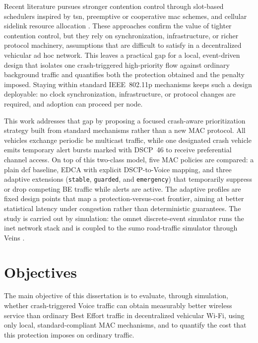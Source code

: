 Recent literature pursues stronger contention control through slot-based schedulers inspired by \gls{tsn}, preemptive or cooperative \gls{mac} schemes, and cellular sidelink resource allocation \cite{TSNCtl_Feraudo, PRP_MAC_Li, CFC_MAC_Linn, CV2X_Sidelink_Allocation}. These approaches confirm the value of tighter contention control, but they rely on synchronization, infrastructure, or richer protocol machinery, assumptions that are difficult to satisfy in a decentralized vehicular ad hoc network. This leaves a practical gap for a local, event-driven design that isolates one crash-triggered high-priority flow against ordinary background traffic and quantifies both the protection obtained and the penalty imposed. Staying within standard IEEE~802.11p mechanisms keeps such a design deployable: no clock synchronization, infrastructure, or protocol changes are required, and adoption can proceed per node.

This work addresses that gap by proposing a focused crash-aware prioritization strategy built from standard mechanisms rather than a new MAC protocol. All vehicles exchange periodic \gls{be} multicast traffic, while one designated crash vehicle emits temporary alert bursts marked with DSCP~46 to receive preferential channel access. On top of this two-class model, five MAC policies are compared: a plain \gls{dcf} baseline, EDCA with explicit DSCP-to-Voice mapping, and three adaptive extensions (\texttt{stable}, \texttt{guarded}, and \texttt{emergency}) that temporarily suppress or drop competing BE traffic while alerts are active. The adaptive profiles are fixed design points that map a protection-versus-cost frontier, aiming at better statistical latency under congestion rather than deterministic guarantees. The study is carried out by simulation: the \gls{omnet} discrete-event simulator runs the \gls{inet} network stack and is coupled to the \gls{sumo} road-traffic simulator through Veins \cite{varga2008omnetpp,inet_framework,veins_sommer2011,lopez2018sumo}.

\section{Objectives}
\label{sec:intro:objectives}

The main objective of this dissertation is to evaluate, through simulation, whether crash-triggered Voice traffic can obtain measurably better wireless service than ordinary Best Effort traffic in decentralized vehicular Wi-Fi, using only local, standard-compliant MAC mechanisms, and to quantify the cost that this protection imposes on ordinary traffic.


